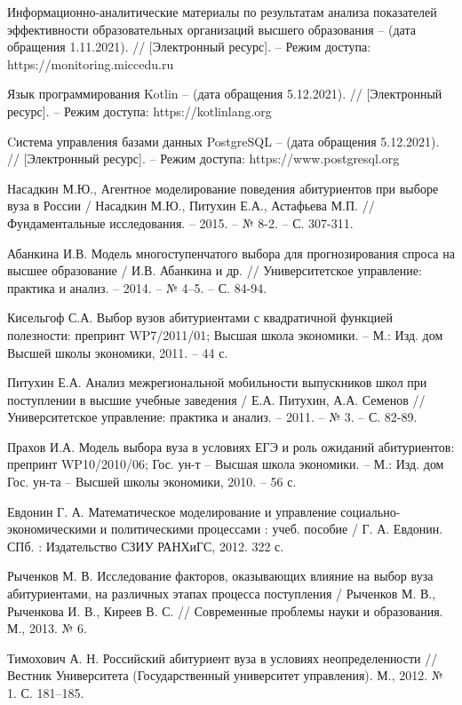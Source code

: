 \begin{thebibliography}{}
	Информационно-аналитические материалы по результатам анализа показателей эффективности образовательных организаций высшего образования – (дата обращения 1.11.2021). // [Электронный ресурс]. – Режим доступа: https://monitoring.miccedu.ru 

	Язык программирования Kotlin – (дата обращения 5.12.2021). // [Электронный ресурс]. – Режим доступа: https://kotlinlang.org

	Cистема управления базами данных PostgreSQL – (дата обращения 5.12.2021). // [Электронный ресурс]. – Режим доступа: https://www.postgresql.org

	Насадкин М.Ю., Агентное моделирование поведения абитуриентов при выборе вуза в России / Насадкин М.Ю., Питухин Е.А., Астафьева М.П. // Фундаментальные исследования. – 2015. – № 8-2. – С. 307-311.

	Абанкина И.В. Модель многоступенчатого выбора для прогнозирования спроса на высшее образование /
	И.В. Абанкина и др. // Университетское управление:
	практика и анализ. – 2014. – № 4–5. – С. 84-94.

	Кисельгоф С.А. Выбор вузов абитуриентами с квадратичной функцией полезности: препринт WP7/2011/01;
	Высшая школа экономики. – М.: Изд. дом Высшей школы экономики, 2011. – 44 с.

	Питухин Е.А. Анализ межрегиональной мобильности выпускников школ при поступлении в высшие учебные заведения 
	/ Е.А. Питухин, А.А. Семенов // Университетское управление: практика и анализ. – 2011. – № 3. – С. 82-89.

	Прахов И.А. Модель выбора вуза в условиях ЕГЭ и роль ожиданий абитуриентов: препринт WP10/2010/06;
	Гос. ун-т – Высшая школа экономики. – М.: Изд. дом Гос. ун-та – Высшей школы экономики, 2010. – 56 с.

	Евдонин Г. А. Математическое моделирование и управление социально-экономическими 
	и политическими процессами : учеб. пособие / Г. А. Евдонин. СПб. : Издательство СЗИУ 
	РАНХиГС, 2012. 322 с.

	Рыченков М. В. Исследование факторов, оказывающих влияние на выбор вуза абитуриентами, на различных этапах процесса поступления / Рыченков М. В., Рыченкова И. В., 
	Киреев В. С. // Современные проблемы науки и образования. М., 2013. № 6.

	Тимохович А. Н. Российский абитуриент вуза в условиях неопределенности // Вестник 
	Университета (Государственный университет управления). М., 2012. № 1. С. 181–185.


\end{thebibliography}
